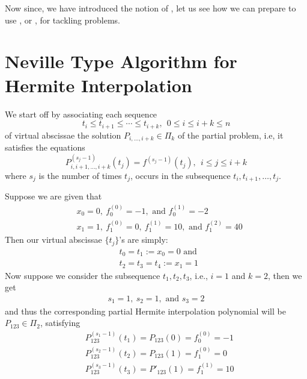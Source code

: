 
Now since, we have introduced the notion of , let us see how we can prepare to use , or , for tackling  problems. 

\section{Neville Type Algorithm for Hermite Interpolation}

We start off by associating each sequence 
\[
    t_i \leq t_{i+1} \leq \cdots \leq t_{i+k}, \ \ 0 \leq i \leq i+k \leq n  
\]
of virtual abscissae the solution $P_{i,\dots,i+k} \in \Pi_k$ of the partial  problem, i.e, it satisfies the equations 
\begin{equation}\label{eq1:mar21A}
    P^{(s_j-1)}_{i,i+1,\dots,i+k}(t_j) = f^{(s_j-1)}(t_j), \ \ i \leq j \leq i+k
\end{equation}
where $s_j$ is the number of times $t_j$, occurs in the subsequence $t_i, t_{i+1}, \dots, t_j$.

\begin{example}\label{eg1:mar21A}
    Suppose we are given that 
    \begin{align*}
        &x_0 = 0, \ f_0^{(0)} = -1, \mbox{ and } f_0^{(1)} = -2 \\ 
        &x_1 = 1, \ f^{(0)}_1 = 0, \ f^{(1)}_1 = 10, \mbox{ and } f^{(2)}_1 = 40
    \end{align*}
    Then our virtual abscissae $\{t_j\}$'s are simply:
    \begin{align*}
        &t_0 = t_1 := x_0 = 0 \mbox{ and } \\
        &t_2 = t_3 = t_4 := x_1 = 1
    \end{align*}
    Now suppose we consider the subsequence $t_1, t_2, t_3$, i.e., $i = 1$ and $k = 2$, then we get 
    \begin{align*}
        s_1 = 1, \ s_2 = 1, \mbox{ and } s_3 = 2
    \end{align*}
    and thus the corresponding partial Hermite interpolation polynomial will be $P_{123} \in \Pi_2$, satisfying 
    \begin{align*}
        &P_{123}^{(s_1 - 1)}(t_1) = P_{123}(0) = f_0^{(0)} = -1 \\
        &P_{123}^{(s_2-1)}(t_2) = P_{123}(1) = f_1^{(0)} = 0 \\ 
        &P_{123}^{(s_3-1)}(t_3) = P'_{123}(1) = f_1^{(1)} = 10 
    \end{align*}
\end{example}

